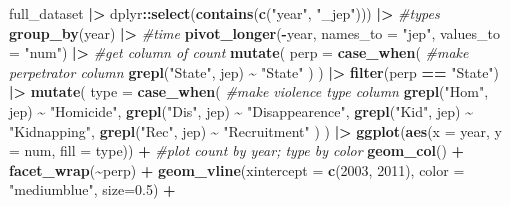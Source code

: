 \documentclass[
]{article}
\newenvironment{Shaded}{\begin{snugshade}}{\end{snugshade}}
\newcommand{\AttributeTok}[1]{\textcolor[rgb]{0.13,0.29,0.53}{#1}}
\newcommand{\CommentTok}[1]{\textcolor[rgb]{0.56,0.35,0.01}{\textit{#1}}}
\newcommand{\DecValTok}[1]{\textcolor[rgb]{0.00,0.00,0.81}{#1}}
\newcommand{\FloatTok}[1]{\textcolor[rgb]{0.00,0.00,0.81}{#1}}
\newcommand{\FunctionTok}[1]{\textcolor[rgb]{0.13,0.29,0.53}{\textbf{#1}}}
\newcommand{\NormalTok}[1]{#1}
\newcommand{\SpecialCharTok}[1]{\textcolor[rgb]{0.81,0.36,0.00}{\textbf{#1}}}
\newcommand{\StringTok}[1]{\textcolor[rgb]{0.31,0.60,0.02}{#1}}
\begin{document}
\begin{Shaded}
\begin{Highlighting}[]
\NormalTok{full\_dataset }\SpecialCharTok{|\textgreater{}}
\NormalTok{  dplyr}\SpecialCharTok{::}\FunctionTok{select}\NormalTok{(}\FunctionTok{contains}\NormalTok{(}\FunctionTok{c}\NormalTok{(}\StringTok{"year"}\NormalTok{, }\StringTok{"\_jep"}\NormalTok{))) }\SpecialCharTok{|\textgreater{}} \CommentTok{\#types}
  \FunctionTok{group\_by}\NormalTok{(year) }\SpecialCharTok{|\textgreater{}} \CommentTok{\#time}
  \FunctionTok{pivot\_longer}\NormalTok{(}\SpecialCharTok{{-}}\NormalTok{year, }\AttributeTok{names\_to =} \StringTok{"jep"}\NormalTok{, }\AttributeTok{values\_to =} \StringTok{"num"}\NormalTok{) }\SpecialCharTok{|\textgreater{}} \CommentTok{\#get column of count}
  \FunctionTok{mutate}\NormalTok{(}
    \AttributeTok{perp =} \FunctionTok{case\_when}\NormalTok{( }\CommentTok{\#make perpetrator column}
      \FunctionTok{grepl}\NormalTok{(}\StringTok{"State"}\NormalTok{, jep) }\SpecialCharTok{\textasciitilde{}} \StringTok{"State"}
\NormalTok{    )}
\NormalTok{  ) }\SpecialCharTok{|\textgreater{}}
  \FunctionTok{filter}\NormalTok{(perp }\SpecialCharTok{==} \StringTok{"State"}\NormalTok{) }\SpecialCharTok{|\textgreater{}}
  \FunctionTok{mutate}\NormalTok{(}
    \AttributeTok{type =} \FunctionTok{case\_when}\NormalTok{( }\CommentTok{\#make violence type column}
      \FunctionTok{grepl}\NormalTok{(}\StringTok{"Hom"}\NormalTok{, jep) }\SpecialCharTok{\textasciitilde{}} \StringTok{"Homicide"}\NormalTok{,}
      \FunctionTok{grepl}\NormalTok{(}\StringTok{"Dis"}\NormalTok{, jep) }\SpecialCharTok{\textasciitilde{}} \StringTok{"Disappearence"}\NormalTok{,}
      \FunctionTok{grepl}\NormalTok{(}\StringTok{"Kid"}\NormalTok{, jep) }\SpecialCharTok{\textasciitilde{}} \StringTok{"Kidnapping"}\NormalTok{,}
      \FunctionTok{grepl}\NormalTok{(}\StringTok{"Rec"}\NormalTok{, jep) }\SpecialCharTok{\textasciitilde{}} \StringTok{"Recruitment"}
\NormalTok{    )}
\NormalTok{  ) }\SpecialCharTok{|\textgreater{}}
  \FunctionTok{ggplot}\NormalTok{(}\FunctionTok{aes}\NormalTok{(}\AttributeTok{x =}\NormalTok{ year, }\AttributeTok{y =}\NormalTok{ num, }\AttributeTok{fill =}\NormalTok{ type)) }\SpecialCharTok{+} \CommentTok{\#plot count by year; type by color}
    \FunctionTok{geom\_col}\NormalTok{() }\SpecialCharTok{+}
    \FunctionTok{facet\_wrap}\NormalTok{(}\SpecialCharTok{\textasciitilde{}}\NormalTok{perp) }\SpecialCharTok{+}
  \FunctionTok{geom\_vline}\NormalTok{(}\AttributeTok{xintercept =} \FunctionTok{c}\NormalTok{(}\DecValTok{2003}\NormalTok{, }\DecValTok{2011}\NormalTok{), }\AttributeTok{color =} \StringTok{"mediumblue"}\NormalTok{, }\AttributeTok{size=}\FloatTok{0.5}\NormalTok{) }\SpecialCharTok{+}

\end{Highlighting}
\end{Shaded}
\end{document}
